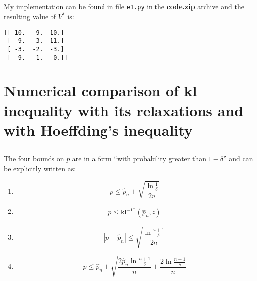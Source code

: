 \documentclass[a4paper]{article}
\begin{document}
\subsection{}
\label{subsec:12}
My implementation can be found in file \texttt{e1.py} in the \textbf{code.zip}
archive and the resulting value of $V^{*}$ is:
\begin{verbatim}
[[-10.  -9. -10.]
 [ -9.  -3. -11.]
 [ -3.  -2.  -3.]
 [ -9.  -1.   0.]]
\end{verbatim}



\section{Numerical comparison of kl inequality with its relaxations and with Hoeffding’s inequality}
\subsection{}
\label{subsec:21}
The four bounds on $p$ are in a form ``with probability greater than $1 - \delta$'' and can
be explicitly written as:
\begin{enumerate}
\item $$p \leq \hat{p}_n+\sqrt{\frac{\ln \frac{1}{\delta}}{2 n}}$$
\item
  \begin{align*}
  p \leq \mathrm{kl}^{-1^{+}}\left(\hat{p}_{n}, z\right)
  \end{align*}
\item $$|p-\hat{p}_n| \leq \sqrt{\frac{\ln \frac{n+1}{\delta}}{2 n}}$$
\item $$ p \leq \hat{p}_n+\sqrt{\frac{2 \hat{p}_n \ln \frac{n+1}{\delta}}{n}}+\frac{2
  \ln \frac{n+1}{\delta}}{n}$$
\end{enumerate}
\end{document}
